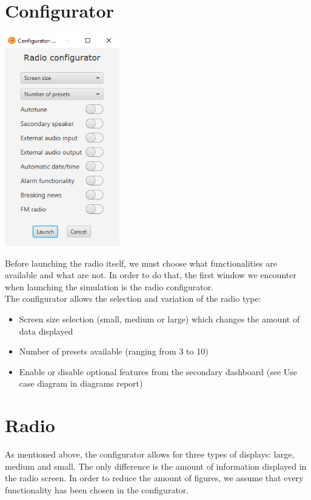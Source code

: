\documentclass[11pt]{article}
\begin{document}
\section{Configurator}
\vspace{20px}
\begin{center}
\includegraphics[width=5cm]{../Screenshots/configurator-v3.png}\\
\end{center}
Before launching the radio itself, we must choose what functionalities are available and what are not. In order to do that, the first window we encounter when launching the simulation is the radio configurator.\\
The configurator allows the selection and variation of the radio type:
\begin{itemize}
\item Screen size selection (small, medium or large) which changes the amount of data displayed
\item Number of presets available (ranging from 3 to 10)
\item Enable or disable optional features from the secondary dashboard (see Use case diagram in diagrams report)
\end{itemize}


\section{Radio}
As mentioned above, the configurator allows for three types of displays: large, medium and small. The only difference is the amount of information displayed in the radio screen. In order to reduce the amount of figures, we assume that every functionality has been chosen in the configurator.
\end{document}
